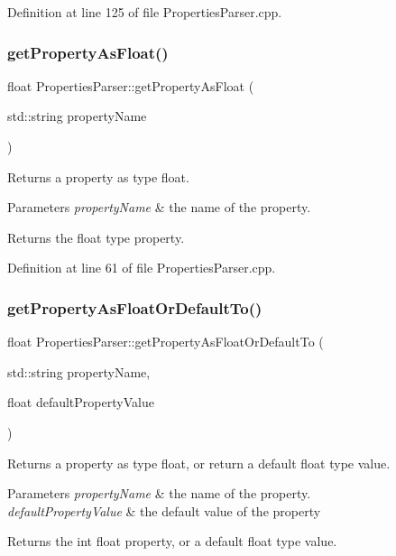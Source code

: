 Definition at line 125 of file Properties\+Parser.\+cpp.

\mbox{\label{class_properties_parser_a2a5c7bdd4d170982e1003ec52283c3c8}} 
\subsubsection{get\+Property\+As\+Float()}
{\footnotesize\ttfamily float Properties\+Parser\+::get\+Property\+As\+Float (\begin{DoxyParamCaption}\item[{std\+::string}]{property\+Name }\end{DoxyParamCaption})}

Returns a property as type float. 
\begin{DoxyParams}{Parameters}
{\em property\+Name} & the name of the property. \\
\hline
\end{DoxyParams}
\begin{DoxyReturn}{Returns}
the float type property. 
\end{DoxyReturn}


Definition at line 61 of file Properties\+Parser.\+cpp.

\mbox{\label{class_properties_parser_a452cb82689e31abc2a1192015328e323}} 
\subsubsection{get\+Property\+As\+Float\+Or\+Default\+To()}
{\footnotesize\ttfamily float Properties\+Parser\+::get\+Property\+As\+Float\+Or\+Default\+To (\begin{DoxyParamCaption}\item[{std\+::string}]{property\+Name,  }\item[{float}]{default\+Property\+Value }\end{DoxyParamCaption})}

Returns a property as type float, or return a default float type value. 
\begin{DoxyParams}{Parameters}
{\em property\+Name} & the name of the property. \\
\hline
{\em default\+Property\+Value} & the default value of the property \\
\hline
\end{DoxyParams}
\begin{DoxyReturn}{Returns}
the int float property, or a default float type value. 
\end{DoxyReturn}


